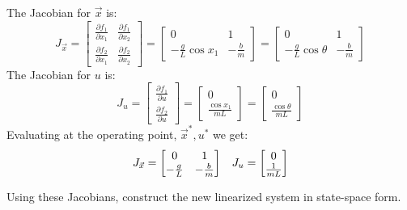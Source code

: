 \begin{enumerate}
{    The Jacobian for $\vec{x}$ is:
    $$J_{\vec{x}} =
    \begin{bmatrix} \frac{\partial f_{1}}{\partial x_{1}} & \frac{\partial f_{1}}{\partial x_{2}} \\
    \frac{\partial f_{2}}{\partial x_{1}} & \frac{\partial f_{2}}{\partial x_{2}}
    \end{bmatrix} = 
    \begin{bmatrix} 0 & 1 \\
    -\frac{g}{L} \cos x_{1} & -\frac{b}{m} 
    \end{bmatrix} = 
    \begin{bmatrix} 0 & 1 \\
    -\frac{g}{L} \cos \theta & -\frac{b}{m} 
    \end{bmatrix}
    $$
    The Jacobian for $u$ is:
    $$J_{u} =
    \begin{bmatrix} \frac{\partial f_{1}}{\partial u} \\ \frac{\partial f_{2}}{\partial u} \end{bmatrix} =
    \begin{bmatrix} 0 \\ \frac{\cos x_{1}}{mL} \end{bmatrix} = 
    \begin{bmatrix} 0 \\ \frac{\cos \theta}{mL} \end{bmatrix}
    $$
    Evaluating at the operating point, $\vec{x}^{*}, u^{*}$ we get:
    $$J_{\vec{x}} =
    \begin{bmatrix} 0 & 1 \\
    -\frac{g}{L} & -\frac{b}{m} 
    \end{bmatrix} \hspace{0.3 cm}
    J_{u} =
    \begin{bmatrix} 0 \\ \frac{1}{mL} \end{bmatrix}
    $$
  }

  \qitem Using these Jacobians, construct the new linearized system in state-space form.



\end{enumerate}
